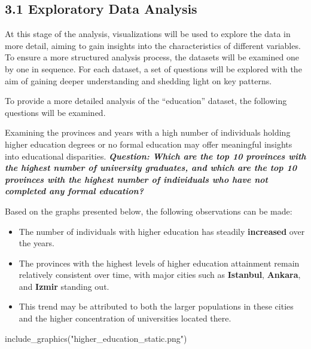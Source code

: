 \documentclass[
  11pt,
  a4paper,
  DIV=11,
  numbers=noendperiod]{scrartcl}
\newenvironment{Shaded}{\begin{snugshade}}{\end{snugshade}}
\newcommand{\FunctionTok}[1]{\textcolor[rgb]{0.28,0.35,0.67}{#1}}
\newcommand{\NormalTok}[1]{\textcolor[rgb]{0.00,0.23,0.31}{#1}}
\newcommand{\StringTok}[1]{\textcolor[rgb]{0.13,0.47,0.30}{#1}}
\begin{document}
\subsection{3.1 Exploratory Data
Analysis}\label{exploratory-data-analysis}

At this stage of the analysis, visualizations will be used to explore
the data in more detail, aiming to gain insights into the
characteristics of different variables. To ensure a more structured
analysis process, the datasets will be examined one by one in sequence.
For each dataset, a set of questions will be explored with the aim of
gaining deeper understanding and shedding light on key patterns.

To provide a more detailed analysis of the ``education'' dataset, the
following questions will be examined.

Examining the provinces and years with a high number of individuals
holding higher education degrees or no formal education may offer
meaningful insights into educational disparities.
{\textbf{\emph{Question: Which are the top 10 provinces with the highest
number of university graduates, and which are the top 10 provinces with
the highest number of individuals who have not completed any formal
education?}}}

Based on the graphs presented below, the following observations can be
made:

\begin{itemize}
\item
  The number of individuals with higher education has steadily
  {\textbf{increased}} over the years.
\item
  The provinces with the highest levels of higher education attainment
  remain relatively consistent over time, with major cities such as
  {\textbf{Istanbul}}, {\textbf{Ankara}}, and {\textbf{Izmir}} standing
  out.
\item
  This trend may be attributed to both the larger populations in these
  cities and the higher concentration of universities located there.
\end{itemize}

\begin{Shaded}
\begin{Highlighting}[]
\FunctionTok{include\_graphics}\NormalTok{(}\StringTok{"higher\_education\_static.png"}\NormalTok{)}
\end{Highlighting}
\end{Shaded}
\end{document}
